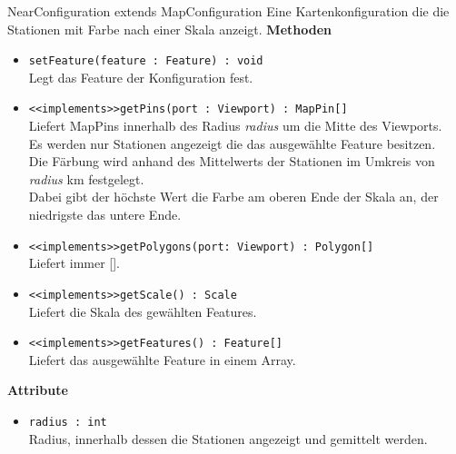     \begin{Class}{NearConfiguration extends MapConfiguration}
        Eine Kartenkonfiguration die die Stationen mit Farbe nach einer Skala anzeigt.
        \textbf{Methoden}
        \begin{itemize}
            \item \texttt{setFeature(feature : Feature) : void}
            \\ Legt das Feature der Konfiguration fest.
            \item \texttt{<<implements>>getPins(port : Viewport) : MapPin[]}
            \\ Liefert MapPins innerhalb des Radius \emph{radius} um die Mitte des Viewports.
            \\ Es werden nur Stationen angezeigt die das ausgewählte Feature besitzen.
            \\ Die Färbung wird anhand des Mittelwerts der Stationen im Umkreis von \emph{radius} km festgelegt.
            \\ Dabei gibt der höchste Wert die Farbe am oberen Ende der Skala an, der niedrigste das untere Ende.
            \item \texttt{<<implements>>getPolygons(port: Viewport) : Polygon[]}
            \\ Liefert immer [].
            \item \texttt{<<implements>>getScale() : Scale}
            \\ Liefert die Skala des gewählten Features.
            \item \texttt{<<implements>>getFeatures() : Feature[]}
            \\ Liefert das ausgewählte Feature in einem Array.
        \end{itemize}
        \textbf{Attribute}
        \begin{itemize}
            \item \texttt{radius : int}
            \\ Radius, innerhalb dessen die Stationen angezeigt und gemittelt werden.
        \end{itemize}
    \end{Class}

